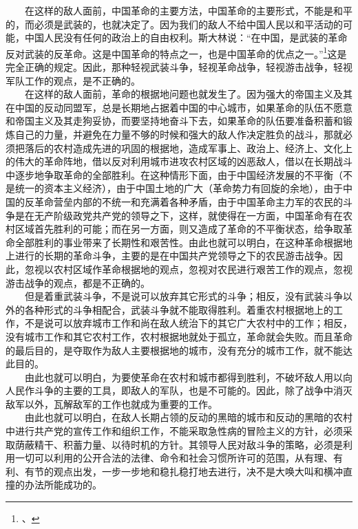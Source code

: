 \documentclass[cn,11pt,chinese]{elegantbook}
\begin{document}
　　在这样的敌人面前，中国革命的主要方法，中国革命的主要形式，不能是和平的，而必须是武装的，也就决定了。因为我们的敌人不给中国人民以和平活动的可能，中国人民没有任何的政治上的自由权利。斯大林说：“在中国，是武装的革命反对武装的反革命。这是中国革命的特点之一，也是中国革命的优点之一。”\footnote[33]{、}这是完全正确的规定。因此，那种轻视武装斗争，轻视革命战争，轻视游击战争，轻视军队工作的观点，是不正确的。\\
　　在这样的敌人面前，革命的根据地问题也就发生了。因为强大的帝国主义及其在中国的反动同盟军，总是长期地占据着中国的中心城市，如果革命的队伍不愿意和帝国主义及其走狗妥协，而要坚持地奋斗下去，如果革命的队伍要准备积蓄和锻炼自己的力量，并避免在力量不够的时候和强大的敌人作决定胜负的战斗，那就必须把落后的农村造成先进的巩固的根据地，造成军事上、政治上、经济上、文化上的伟大的革命阵地，借以反对利用城市进攻农村区域的凶恶敌人，借以在长期战斗中逐步地争取革命的全部胜利。在这种情形下面，由于中国经济发展的不平衡（不是统一的资本主义经济），由于中国土地的广大（革命势力有回旋的余地），由于中国的反革命营垒内部的不统一和充满着各种矛盾，由于中国革命主力军的农民的斗争是在无产阶级政党共产党的领导之下，这样，就使得在一方面，中国革命有在农村区域首先胜利的可能；而在另一方面，则又造成了革命的不平衡状态，给争取革命全部胜利的事业带来了长期性和艰苦性。由此也就可以明白，在这种革命根据地上进行的长期的革命斗争，主要的是在中国共产党领导之下的农民游击战争。因此，忽视以农村区域作革命根据地的观点，忽视对农民进行艰苦工作的观点，忽视游击战争的观点，都是不正确的。\\
　　但是着重武装斗争，不是说可以放弃其它形式的斗争；相反，没有武装斗争以外的各种形式的斗争相配合，武装斗争就不能取得胜利。着重农村根据地上的工作，不是说可以放弃城市工作和尚在敌人统治下的其它广大农村中的工作；相反，没有城市工作和其它农村工作，农村根据地就处于孤立，革命就会失败。而且革命的最后目的，是夺取作为敌人主要根据地的城市，没有充分的城市工作，就不能达此目的。\\
　　由此也就可以明白，为要使革命在农村和城市都得到胜利，不破坏敌人用以向人民作斗争的主要的工具，即敌人的军队，也是不可能的。因此，除了战争中消灭敌军以外，瓦解敌军的工作也就成为重要的工作。\\
　　由此也就可以明白，在敌人长期占领的反动的黑暗的城市和反动的黑暗的农村中进行共产党的宣传工作和组织工作，不能采取急性病的冒险主义的方针，必须采取荫蔽精干、积蓄力量、以待时机的方针。其领导人民对敌斗争的策略，必须是利用一切可以利用的公开合法的法律、命令和社会习惯所许可的范围，从有理、有利、有节的观点出发，一步一步地和稳扎稳打地去进行，决不是大唤大叫和横冲直撞的办法所能成功的。\\
\end{document}

